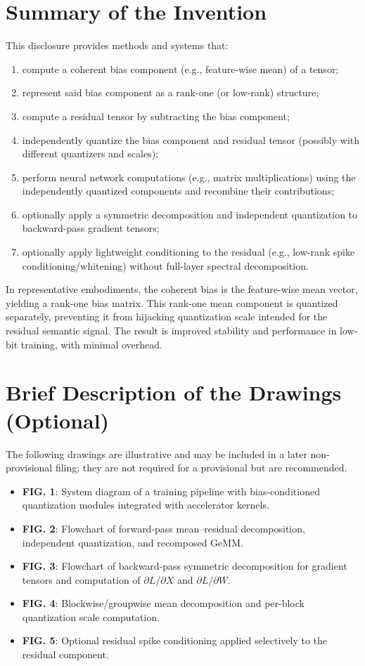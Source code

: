 \documentclass[11pt]{article}
\begin{document}
\section{Summary of the Invention}
This disclosure provides methods and systems that:
\begin{enumerate}[leftmargin=1.3em]
\item compute a coherent bias component (e.g., feature-wise mean) of a tensor;
\item represent said bias component as a rank-one (or low-rank) structure;
\item compute a residual tensor by subtracting the bias component;
\item independently quantize the bias component and residual tensor (possibly with different quantizers and scales);
\item perform neural network computations (e.g., matrix multiplications) using the independently quantized components and recombine their contributions;
\item optionally apply a symmetric decomposition and independent quantization to backward-pass gradient tensors;
\item optionally apply lightweight conditioning to the residual (e.g., low-rank spike conditioning/whitening) without full-layer spectral decomposition.
\end{enumerate}
In representative embodiments, the coherent bias is the feature-wise mean vector, yielding a rank-one bias matrix. This rank-one mean component is quantized separately, preventing it from hijacking quantization scale intended for the residual semantic signal. The result is improved stability and performance in low-bit training, with minimal overhead.

\section{Brief Description of the Drawings (Optional)}
The following drawings are illustrative and may be included in a later non-provisional filing; they are not required for a provisional but are recommended.
\begin{itemize}[leftmargin=1.2em]
\item \textbf{FIG. 1}: System diagram of a training pipeline with bias-conditioned quantization modules integrated with accelerator kernels.
\item \textbf{FIG. 2}: Flowchart of forward-pass mean--residual decomposition, independent quantization, and recomposed GeMM.
\item \textbf{FIG. 3}: Flowchart of backward-pass symmetric decomposition for gradient tensors and computation of $\partial L/\partial X$ and $\partial L/\partial W$.
\item \textbf{FIG. 4}: Blockwise/groupwise mean decomposition and per-block quantization scale computation.
\item \textbf{FIG. 5}: Optional residual spike conditioning applied selectively to the residual component.
\end{itemize}
\end{document}
